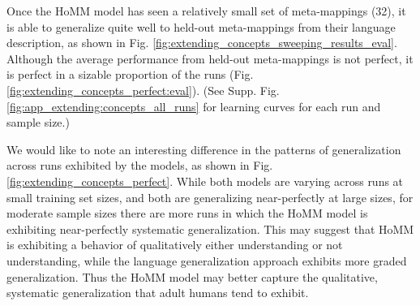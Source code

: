 Once the HoMM model has seen a relatively small set of meta-mappings (32), it is able to generalize quite well to held-out meta-mappings from their language description, as shown in Fig. \ref{fig:extending_concepts_sweeping_results_eval}. Although the average performance from held-out meta-mappings is not perfect, it is perfect in a sizable proportion of the runs (Fig. \ref{fig:extending_concepts_perfect:eval}). (See Supp. Fig. \ref{fig:app_extending:concepts_all_runs} for learning curves for each run and sample size.) \par

We would like to note an interesting difference in the patterns of generalization across runs exhibited by the models, as shown in Fig. \ref{fig:extending_concepts_perfect}. While both models are varying across runs at small training set sizes, and both are generalizing near-perfectly at large sizes, for moderate sample sizes there are more runs in which the HoMM model is exhibiting near-perfectly systematic generalization. This may suggest that HoMM is exhibiting a behavior of qualitatively either understanding or not understanding, while the language generalization approach exhibits more graded generalization. Thus the HoMM model may better capture the qualitative, systematic generalization that adult humans tend to exhibit.

